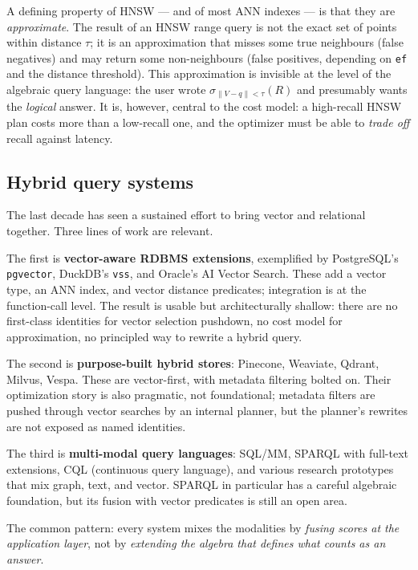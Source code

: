 \documentclass[sigconf,nonacm,review]{acmart}
\theoremstyle{plain}
\theoremstyle{definition}
\theoremstyle{remark}
\begin{document}
A defining property of HNSW --- and of most ANN indexes --- is that
they are \emph{approximate}. The result of an HNSW range query is
not the exact set of points within distance $\tau$; it is an
approximation that misses some true neighbours (false negatives) and
may return some non-neighbours (false positives, depending on
\texttt{ef} and the distance threshold). This approximation is
invisible at the level of the algebraic query language: the user
wrote $\sigma_{\lVert V-q\rVert < \tau}(R)$ and presumably wants the
\emph{logical} answer. It is, however, central to the cost model: a
high-recall HNSW plan costs more than a low-recall one, and the
optimizer must be able to \emph{trade off} recall against latency.

\subsection{Hybrid query systems}

The last decade has seen a sustained effort to bring vector and
relational together. Three lines of work are relevant.

The first is \textbf{vector-aware RDBMS extensions}, exemplified by
PostgreSQL's \texttt{pgvector}, DuckDB's \texttt{vss}, and Oracle's
AI Vector Search. These add a vector type, an ANN index, and vector
distance predicates; integration is at the function-call level. The
result is usable but architecturally shallow: there are no
first-class identities for vector selection pushdown, no cost model
for approximation, no principled way to rewrite a hybrid query.

The second is \textbf{purpose-built hybrid stores}: Pinecone,
Weaviate, Qdrant, Milvus, Vespa. These are vector-first, with
metadata filtering bolted on. Their optimization story is also
pragmatic, not foundational; metadata filters are pushed through
vector searches by an internal planner, but the planner's rewrites
are not exposed as named identities.

The third is \textbf{multi-modal query languages}: SQL/MM, SPARQL with
full-text extensions, CQL (continuous query language), and various
research prototypes that mix graph, text, and vector. SPARQL in
particular has a careful algebraic foundation, but its fusion with
vector predicates is still an open area.

The common pattern: every system mixes the modalities by
\emph{fusing scores at the application layer}, not by \emph{extending
the algebra that defines what counts as an answer}.
\end{document}
